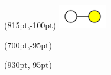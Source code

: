 \begin{textblock*}{\textwidth}(815pt,-100pt)
	\includegraphics[width=60pt]{img/subgraph/wy.png}
\end{textblock*}
\begin{textblock*}{\textwidth}(700pt,-95pt)
	\scriptsize
	\fontsize{18pt}{0pt} 
\end{textblock*}
\begin{textblock*}{\textwidth}(930pt,-95pt)
	\scriptsize
	\fontsize{18pt}{0pt} 
\end{textblock*}
